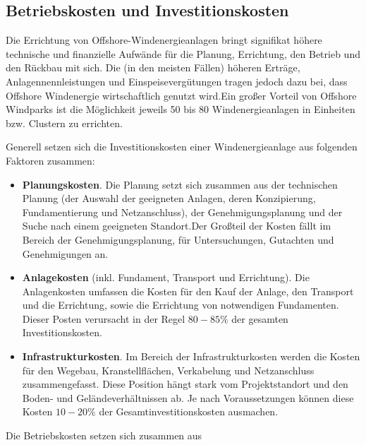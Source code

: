 \documentclass[a4paper,12pt]{article}
\begin{document}
	\subsection{Betriebskosten und Investitionskosten}
	Die Errichtung von Offshore-Windenergieanlagen bringt signifikat höhere technische und finanzielle Aufwände für die Planung, Errichtung, den Betrieb und den Rückbau mit sich. Die (in den meisten Fällen) höheren Erträge, Anlagennennleistungen und Einspeisevergütungen tragen jedoch dazu bei, dass Offshore Windenergie wirtschaftlich genutzt wird.\newline Ein großer Vorteil von Offshore Windparks ist die Möglichkeit jeweils 50 bis 80 Windenergieanlagen in Einheiten bzw. Clustern zu errichten.\\ \par
	\noindent Generell setzen sich die Investitionskosten einer Windenergieanlage aus folgenden Faktoren zusammen:
	\begin{itemize}
		\item \textbf{Planungskosten}. Die Planung setzt sich zusammen aus der technischen Planung (der Auswahl der geeigneten Anlagen, deren Konzipierung, Fundamentierung und Netzanschluss), der Genehmigungsplanung und der Suche nach einem geeigneten Standort.\newline Der Großteil der Kosten fällt im Bereich der Genehmigungsplanung, für Untersuchungen, Gutachten und Genehmigungen an.
		\item \textbf{Anlagekosten} (inkl. Fundament, Transport und Errichtung). Die Anlagenkosten umfassen die Kosten für den Kauf der Anlage, den Transport und die Errichtung, sowie die Errichtung von notwendigen Fundamenten.\newline
		Dieser Posten verursacht in der Regel $80 - 85\%$ der gesamten Investitionskosten.
		\item \textbf{Infrastrukturkosten}. Im Bereich der Infrastrukturkosten werden die Kosten für den Wegebau, Kranstellflächen, Verkabelung und Netzanschluss zusammengefasst. Diese Position hängt stark vom Projektstandort und den Boden- und Geländeverhältnissen ab.\newline
		Je nach Voraussetzungen können diese Kosten $10 - 20\%$ der Gesamtinvestitionskosten ausmachen.
	\end{itemize}
	Die Betriebskosten setzen sich zusammen aus
\end{document}
